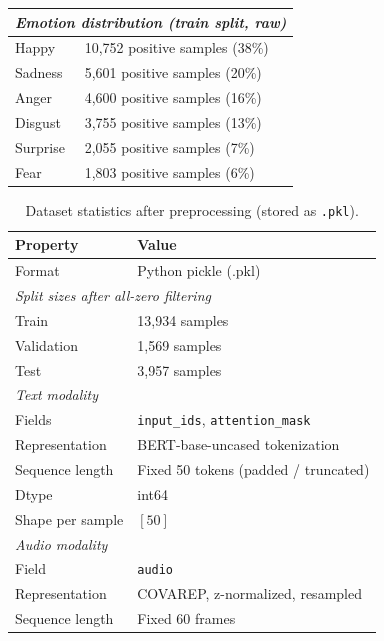 \begin{table}[H]
\begin{tabular}{ll}
\hline
\multicolumn{2}{l}{\textit{Emotion distribution (train split, raw)}} \\
\hline
Happy    & 10,752 positive samples (38\%) \\
Sadness  & 5,601  positive samples (20\%) \\
Anger    & 4,600  positive samples (16\%) \\
Disgust  & 3,755  positive samples (13\%) \\
Surprise & 2,055  positive samples (7\%) \\
Fear     & 1,803  positive samples (6\%) \\
\hline
\end{tabular}
\end{table}
 
\begin{table}[H]
\centering
\caption{Dataset statistics after preprocessing (stored as \texttt{.pkl}).}
\label{tab:after_preprocessing}
\begin{tabular}{ll}
\hline
\textbf{Property} & \textbf{Value} \\
\hline
Format                        & Python pickle (.pkl) \\
\hline
\multicolumn{2}{l}{\textit{Split sizes after all-zero filtering}} \\
\hline
Train                         & 13,934 samples \\
Validation                    & 1,569  samples \\
Test                          & 3,957  samples \\
\hline
\multicolumn{2}{l}{\textit{Text modality}} \\
\hline
Fields                        & \texttt{input\_ids}, \texttt{attention\_mask} \\
Representation                & BERT-base-uncased tokenization \\
Sequence length               & Fixed 50 tokens (padded / truncated) \\
Dtype                         & int64 \\
Shape per sample              & $[50]$ \\
\hline
\multicolumn{2}{l}{\textit{Audio modality}} \\
\hline
Field                         & \texttt{audio} \\
Representation                & COVAREP, z-normalized, resampled \\
Sequence length               & Fixed 60 frames \\

\end{tabular}
\end{table}
